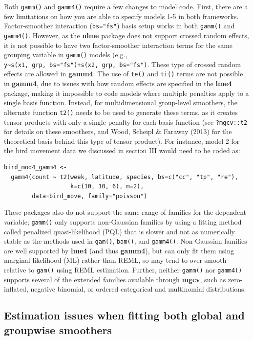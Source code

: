 \documentclass[12pt]{article}
\begin{document}
Both \texttt{gamm()} and \texttt{gamm4()} require a few changes to model
code. First, there are a few limitations on how you are able to specify
models 1-5 in both frameworks. Factor-smoother interaction
(\texttt{bs="fs"}) basis setup works in both \texttt{gamm()} and
\texttt{gamm4()}. However, as the \textbf{nlme} package does not support
crossed random effects, it is not possible to have two factor-smoother
interaction terms for the same grouping variable in \texttt{gamm()}
models (e.g.,
\texttt{y\textasciitilde{}s(x1,\ grp,\ bs="fs")+s(x2,\ grp,\ bs="fs")}.
These type of crossed random effects are allowed in \textbf{gamm4}. The
use of \texttt{te()} and \texttt{ti()} terms are not possible in
\textbf{gamm4}, due to issues with how random effects are specified in
the \textbf{lme4} package, making it impossible to code models where
multiple penalties apply to a single basis function. Instead, for
multidimensional group-level smoothers, the alternate function
\texttt{t2()} needs to be used to generate these terms, as it creates
tensor products with only a single penalty for each basis function (see
\texttt{?mgcv::t2} for details on these smoothers, and Wood, Scheipl \&
Faraway (2013) for the theoretical basis behind this type of tensor
product). For instance, model 2 for the bird movement data we discussed
in section III would need to be coded as:

\begin{verbatim}
bird_mod4_gamm4 <-
  gamm4(count ~ t2(week, latitude, species, bs=c("cc", "tp", "re"),
                   k=c(10, 10, 6), m=2),
        data=bird_move, family="poisson")
\end{verbatim}

These packages also do not support the same range of families for the
dependent variable; \texttt{gamm()} only supports non-Gaussian families
by using a fitting method called penalized quasi-likelihood (PQL) that
is slower and not as numerically stable as the methods used in
\texttt{gam()}, \texttt{bam()}, and \texttt{gamm4()}. Non-Gaussian
families are well supported by \textbf{lme4} (and thus \textbf{gamm4}),
but can only fit them using marginal likelihood (ML) rather than REML,
so may tend to over-smooth relative to \texttt{gam()} using REML
estimation. Further, neither \texttt{gamm()} nor \texttt{gamm4()}
supports several of the extended families available through
\textbf{mgcv}, such as zero-inflated, negative binomial, or ordered
categorical and multinomial distributions.

\subsection{Estimation issues when fitting both global and groupwise
smoothers}\label{estimation-issues-when-fitting-both-global-and-groupwise-smoothers}
\end{document}
